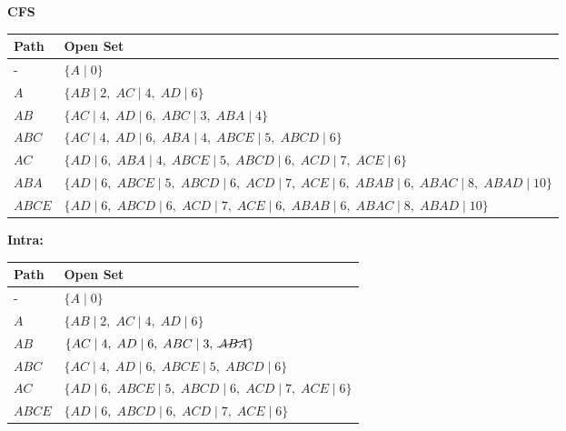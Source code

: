 \begin{example} \textbf{CFS}
    \begin{center}
        \begin{tabular}{ll}
        \toprule
        \textbf{Path} & \textbf{Open Set} \\
        \midrule
        - & $\{A \mid 0\}$ \\
        $A$ & $\{AB \mid 2, \; AC \mid 4, \; AD \mid 6\}$ \\
        $AB$ & $\{AC \mid 4, \; AD \mid 6, \; ABC \mid 3, \; ABA \mid 4\}$ \\
        $ABC$ & $\{AC \mid 4, \; AD \mid 6, \; ABA \mid 4, \; ABCE \mid 5, \; ABCD \mid 6\}$ \\
        $AC$ & $\{AD \mid 6, \; ABA \mid 4, \; ABCE \mid 5, \; ABCD \mid 6, \; ACD \mid 7, \; ACE \mid 6\}$ \\
        $ABA$ & $\{AD \mid 6, \; ABCE \mid 5, \; ABCD \mid 6, \; ACD \mid 7, \; ACE \mid 6, \; ABAB \mid 6, \; ABAC \mid 8, \; ABAD \mid 10\}$ \\
        $ABCE$ & $\{AD \mid 6, \; ABCD \mid 6, \; ACD \mid 7, \; ACE \mid 6, \; ABAB \mid 6, \; ABAC \mid 8, \; ABAD \mid 10\}$ \\
        \bottomrule
        \end{tabular}
    \end{center}
    \vspace{1em}

    \textbf{Intra:}
    \begin{center}
        \begin{tabular}{ll}
        \toprule
        \textbf{Path} & \textbf{Open Set} \\
        \midrule
        - & $\{A \mid 0\}$ \\
        $A$ & $\{AB \mid 2, \; AC \mid 4, \; AD \mid 6\}$ \\
        $AB$ & $\{AC \mid 4, \; AD \mid 6, \; ABC \mid 3, \; \cancel{ABA} \}$ \\
        $ABC$ & $\{AC \mid 4, \; AD \mid 6, \; ABCE \mid 5, \; ABCD \mid 6\}$ \\
        $AC$ & $\{AD \mid 6, \; ABCE \mid 5, \; ABCD \mid 6, \; ACD \mid 7, \; ACE \mid 6\}$ \\
        $ABCE$ & $\{AD \mid 6, \; ABCD \mid 6, \; ACD \mid 7, \; ACE \mid 6\}$ \\
        \bottomrule
        \end{tabular}
    \end{center}
    \vspace{1em}


\end{example}
